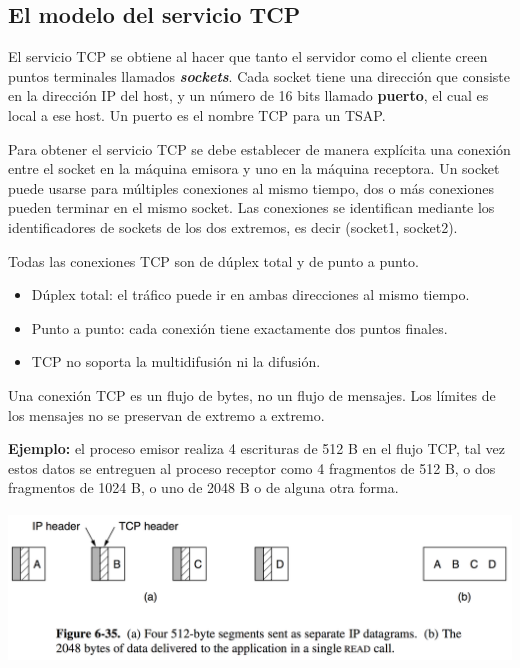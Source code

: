 \documentclass[10pt,a4paper]{report}
\begin{document}
\subsection{El modelo del servicio TCP}
\par El servicio TCP se obtiene al hacer que tanto el servidor como el cliente creen 
puntos terminales llamados \textbf{\textit{sockets}}. Cada socket tiene una dirección 
que consiste en la dirección IP del host, y un número de 16 bits llamado \textbf{puerto}, el cual es local a ese host. Un puerto es el nombre TCP para un TSAP.
\par Para obtener el servicio TCP se debe establecer de manera explícita una conexión entre el socket en la máquina emisora y uno en la máquina receptora. Un socket puede usarse para múltiples conexiones al mismo tiempo, dos o más conexiones pueden terminar en el mismo socket. Las conexiones se identifican mediante los identificadores de sockets de los dos extremos, es decir (socket1, socket2).
\par Todas las conexiones TCP son de dúplex total y de punto a punto.
	\begin{itemize}
		\item Dúplex total: el tráfico puede ir en ambas direcciones al mismo tiempo.
		\item Punto a punto: cada conexión tiene exactamente dos puntos finales.
		\item  TCP no soporta la multidifusión ni la difusión.
	\end{itemize}
\par Una conexión TCP es un flujo de bytes, no un flujo de mensajes. Los límites de los 
mensajes no se preservan de extremo a extremo.

\textbf{Ejemplo:} el proceso emisor realiza 4 escrituras de 512 B en el flujo TCP, tal 
vez estos datos se entreguen al proceso receptor como 4 fragmentos de 512 B, o dos 
fragmentos de 1024 B, o uno de 2048 B o de alguna otra forma.

	\begin{center}
	\includegraphics[width=14cm, height=4cm]{./imagenes/tcp.png} 
	\end{center}
\end{document}

